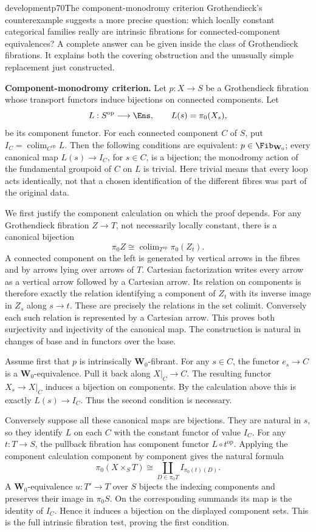 \begin{dcomment}{development}{p70}{The component-monodromy criterion}
Grothendieck's counterexample suggests a more precise question: which locally constant categorical families really are intrinsic fibrations for connected-component equivalences? A complete answer can be given inside the class of Grothendieck fibrations. It explains both the covering obstruction and the unusually simple replacement just constructed.

\textbf{Component-monodromy criterion.}\ours\quad
Let $p:X\to S$ be a Grothendieck fibration whose transport functors induce bijections on connected components. Let
\[
 L:S^{\mathrm{op}}\longrightarrow\Ens,\qquad L(s)=\pi_0(X_s),
\]
be its component functor. For each connected component $C$ of $S$, put $I_C=\operatorname{colim}_{C^{\mathrm{op}}}L$. Then the following conditions are equivalent: $p\in\Fib_{\mathbf W_0}$; every canonical map $L(s)\to I_C$, for $s\in C$, is a bijection; the monodromy action of the fundamental groupoid of $C$ on $L$ is trivial. Here trivial means that every loop acts identically, not that a chosen identification of the different fibres was part of the original data.

We first justify the component calculation on which the proof depends. For any Grothendieck fibration $Z\to T$, not necessarily locally constant, there is a canonical bijection
\[
 \pi_0Z\cong\operatorname{colim}_{T^{\mathrm{op}}}\pi_0(Z_t).
\]
A connected component on the left is generated by vertical arrows in the fibres and by arrows lying over arrows of $T$. Cartesian factorization writes every arrow as a vertical arrow followed by a Cartesian arrow. Its relation on components is therefore exactly the relation identifying a component of $Z_t$ with its inverse image in $Z_s$ along $s\to t$. These are precisely the relations in the set colimit. Conversely each such relation is represented by a Cartesian arrow. This proves both surjectivity and injectivity of the canonical map. The construction is natural in changes of base and in functors over the base.

Assume first that $p$ is intrinsically $\mathbf W_0$-fibrant. For any $s\in C$, the functor $e_s\to C$ is a $\mathbf W_0$-equivalence. Pull it back along $X|_C\to C$. The resulting functor $X_s\to X|_C$ induces a bijection on components. By the calculation above this is exactly $L(s)\to I_C$. Thus the second condition is necessary.

Conversely suppose all these canonical maps are bijections. They are natural in $s$, so they identify $L$ on each $C$ with the constant functor of value $I_C$. For any $t:T\to S$, the pullback fibration has component functor $L\circ t^{\mathrm{op}}$. Applying the component calculation component by component gives the natural formula
\[
 \pi_0(X\times_ST)
 \cong\coprod_{D\in\pi_0T} I_{\pi_0(t)(D)}.
\]
A $\mathbf W_0$-equivalence $u:T'\to T$ over $S$ bijects the indexing components and preserves their image in $\pi_0S$. On the corresponding summands its map is the identity of $I_C$. Hence it induces a bijection on the displayed component sets. This is the full intrinsic fibration test, proving the first condition.


\end{dcomment}
